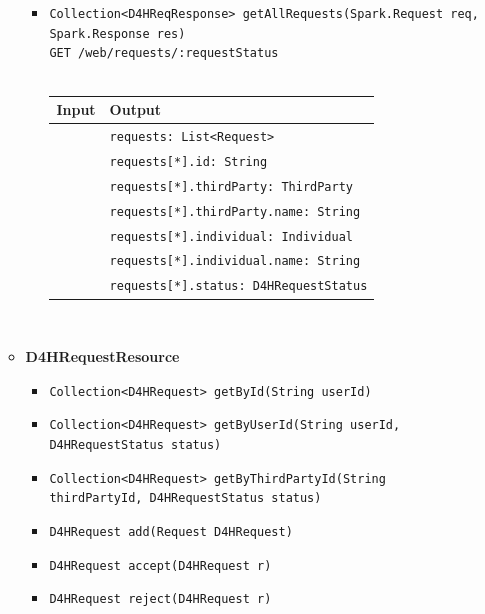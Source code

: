 \documentclass[a4paper, hidelinks, 12pt]{report}
\begin{document}
\begin{itemize}
\begin{itemize}
\begin{itemize}
			\item{\verb|Collection<D4HReqResponse> getAllRequests(Spark.Request req,|\\ \verb|Spark.Response res)|\\ \verb|GET /web/requests/:requestStatus|}\\\\
			\begin{tabular}{l | l}
			\textbf{Input} & \textbf{Output} \\
			\hline
				& \verb|requests: List<Request>| \\
				& \verb|requests[*].id: String| \\
				& \verb|requests[*].thirdParty: ThirdParty| \\
				& \verb|requests[*].thirdParty.name: String| \\
				& \verb|requests[*].individual: Individual| \\
				& \verb|requests[*].individual.name: String| \\
				& \verb|requests[*].status: D4HRequestStatus| \\
			\end{tabular}\\
		\end{itemize}		
				
				\item{\textbf{D4HRequestResource}}
					\begin{itemize}
						\item{\verb|Collection<D4HRequest> getById(String userId)|}
						\item{\verb|Collection<D4HRequest> getByUserId(String userId, D4HRequestStatus status)|}
						\item{\verb|Collection<D4HRequest> getByThirdPartyId(String thirdPartyId, D4HRequestStatus status)|}		
						\item{\verb|D4HRequest add(Request D4HRequest)|}
						\item{\verb|D4HRequest accept(D4HRequest r)|}
						\item{\verb|D4HRequest reject(D4HRequest r)|}
					\end{itemize}
			\end{itemize}	
			

\end{itemize}
\end{document}
